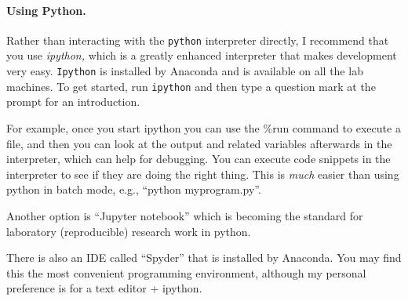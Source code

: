 \documentclass{article}
\begin{document}
\paragraph{Using Python.}  Rather than interacting with the
\texttt{python} interpreter directly, I recommend that you use
\emph{ipython,} which is a greatly enhanced interpreter that makes
development very easy.  \texttt{Ipython} is installed by Anaconda and is
available on all the lab machines.  To get started, run \texttt{ipython}
and then type a question mark at the prompt for an introduction.

For example, once you start ipython you can use the
\%run command to execute a file, and then you can look at the output and
related variables afterwards in the interpreter, which can help for
debugging.  You can execute code snippets in the interpreter to see if
they are doing the right thing.  This is \emph{much} easier than using
python in batch mode, e.g., ``python myprogram.py''.

Another option is ``Jupyter notebook'' which is becoming the standard
for laboratory (reproducible) research work in python.

There is also an IDE called ``Spyder''
that is installed by Anaconda.  You may find this the most convenient
programming environment, although my personal preference is for a text
editor + ipython.
\end{document}
